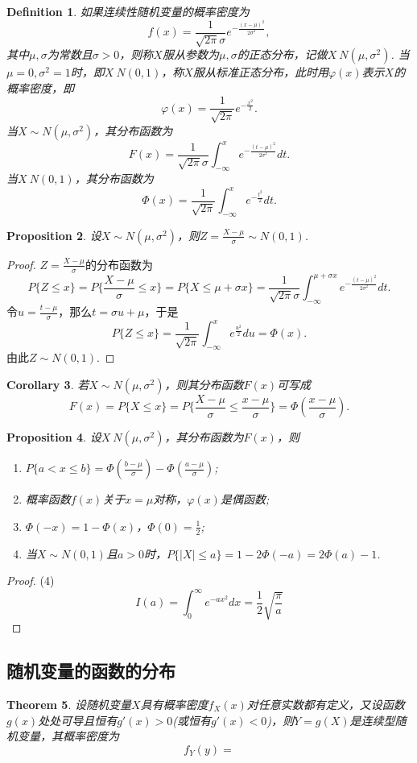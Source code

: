 \documentclass{article}
\newtheorem{theorem}{Theorem}[section]
\newtheorem{corollary}[theorem]{Corollary}
\newtheorem{proposition}[theorem]{Proposition}
\newtheorem{definition}[theorem]{Definition}
\begin{document}
\begin{definition}
\rm 如果连续性随机变量的概率密度为
$$
f(x) = \frac{1}{\sqrt{2\pi}\sigma}e^{-\frac{(x-\mu)^2}{2\sigma^2}},
$$
其中$\mu,\sigma$为常数且$\sigma > 0$，则称$X$服从参数为$\mu,\sigma$的正态分布，记做$X~N(\mu,\sigma^2)$. 当$\mu=0,\sigma^2 =1$时，即$X~N(0,1)$，称$X$服从标准正态分布，此时用$\varphi(x)$表示$X$的概率密度，即
$$
\varphi(x) = \frac{1}{\sqrt{2\pi}}e^{-\frac{x^2}{2}}.
$$
当$X \sim N(\mu,\sigma^2)$，其分布函数为
$$
F(x) = \frac{1}{\sqrt{2\pi}\sigma}\int_{-\infty}^{x}e^{-\frac{(t-\mu)^2}{2\sigma^2}}dt. 
$$
当$X~N(0,1)$，其分布函数为
$$
\Phi(x) = \frac{1}{\sqrt{2\pi}}\int_{-\infty}^x e^{-\frac{t^2}{2}}dt.
$$
\end{definition}

\begin{proposition}
\rm 设$X \sim N(\mu,\sigma^2)$，则$Z = \frac{X-\mu}{\sigma} \sim N(0,1)$. 
\end{proposition}

\begin{proof}
\rm $Z=\frac{X-\mu}{\sigma}$的分布函数为
$$
P\{Z \leq x\} = P\{\frac{X-\mu}{\sigma} \leq x\} = P\{X \leq \mu + \sigma x\} =  \frac{1}{\sqrt{2\pi}\sigma}\int_{-\infty}^{\mu+\sigma x}e^{-\frac{(t-\mu)^2}{2\sigma^2}}dt.
$$
令$u = \frac{t-\mu}{\sigma}$，那么$t = \sigma u + \mu$，于是
$$
P\{Z \leq x\} = \frac{1}{\sqrt{2\pi}}\int_{-\infty}^{x} e^{\frac{u^2}{2}}du = \Phi(x). 
$$
由此$Z \sim N(0,1)$.
\end{proof}

\begin{corollary}
\rm 若$X \sim N(\mu,\sigma^2)$，则其分布函数$F(x)$可写成
$$
F(x) = P\{X \leq x \} = P\{ \frac{X-\mu}{\sigma} \leq \frac{x-\mu}{\sigma} \} = \Phi(\frac{x-\mu}{\sigma}). 
$$
\end{corollary}

\begin{proposition}
\rm 设$X~N(\mu,\sigma^2)$，其分布函数为$F(x)$，则
\begin{enumerate}
	\item $P\{a < x \leq b\} = \Phi(\frac{b-\mu}{\sigma}) - \Phi(\frac{a-\mu}{\sigma})$;
	\item 概率函数$f(x)$关于$x=\mu$对称，$\varphi(x)$是偶函数;
	\item $\Phi(-x) = 1-\Phi(x)$，$\Phi(0) = \frac{1}{2}$;
	\item 当$X \sim N(0,1)$且$a > 0$时，$P\{|X| \leq a\} = 1-2\Phi(-a) = 2\Phi(a) - 1$. 
\end{enumerate}
\end{proposition}

\begin{proof}
{\color{red}(4)}
$$
I(a)=\int_0^{\infty}e^{-ax^2}dx =\frac12 \sqrt{\frac{\pi}{a}}
$$
\end{proof}

\subsection{随机变量的函数的分布}

\begin{theorem}
\rm 设随机变量$X$具有概率密度$f_X(x)$对任意实数都有定义，又设函数$g(x)$处处可导且恒有$g'(x) > 0$(或恒有$g'(x) < 0$)，则$Y = g(X)$是连续型随机变量，其概率密度为
$$
f_Y(y) = 
$$
\end{theorem}
\end{document}
